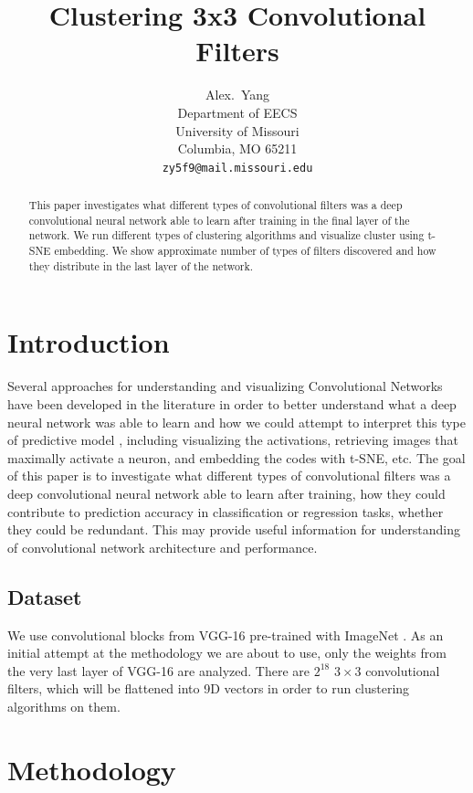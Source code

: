 \documentclass{article} %
\title{Clustering 3x3 Convolutional Filters}
\author{
Alex.~Yang \\
Department of EECS \\
University of Missouri\\
Columbia, MO 65211 \\
\texttt{zy5f9@mail.missouri.edu} \\
}
\begin{document}
\maketitle

\begin{abstract}
This paper investigates what different types of convolutional filters was a deep convolutional neural network able to learn after training in the final layer of the network. We run different types of clustering algorithms and visualize cluster using t-SNE embedding. We show approximate number of types of filters discovered and how they distribute in the last layer of the network.
\end{abstract}

\section{Introduction}

Several approaches for understanding and visualizing Convolutional Networks have been developed in the literature
in order to better understand what a deep neural network was able to learn
and how we could attempt to interpret this type of predictive model \cite{VisCNN},
including visualizing the activations, retrieving images that maximally activate a neuron,
and embedding the codes with t-SNE, etc.
The goal of this paper is to investigate what different types of convolutional filters was a deep convolutional neural network able to learn after training, how they could contribute to prediction accuracy in classification or regression tasks, whether they could be redundant.
This may provide useful information for understanding of convolutional network architecture and performance.

\subsection{Dataset}

We use convolutional blocks from VGG-16 \cite{VGG} pre-trained with ImageNet \cite{IMAGENET}.
As an initial attempt at the methodology we are about to use,
only the weights from the very last layer of VGG-16 are analyzed.
There are $2^{18}$ $3 \times 3$ convolutional filters,
which will be flattened into 9D vectors in order to run clustering algorithms on them.

\section{Methodology}
\end{document}

